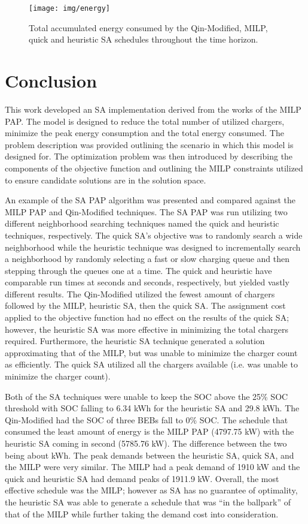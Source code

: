 \documentclass[energies,article,submit,moreauthors]{Definitions/mdpi}
\newcommand{\tempcnt}{9101 }                                                    %
\newcommand{\quicklocal}{0.25 }                                                %
\newcommand{\heuristiclocal}{0.4 }                                             %
\begin{document}
\begin{figure}[htpb]
\centering \texttt{[image: img/energy]}
    \caption{Total accumulated energy consumed by the Qin-Modified, MILP, quick and heuristic SA schedules throughout the time horizon.}
    \label{fig:energy-usage}
\end{figure}

\section{Conclusion}
\label{sec:conclusion}
This work developed an SA implementation derived from the works of the MILP PAP. The model is designed to reduce the
total number of utilized chargers, minimize the peak energy consumption and the total energy consumed. The problem
description was provided outlining the scenario in which this model is designed for. The optimization problem was then
introduced by describing the components of the objective function and outlining the MILP constraints utilized to ensure
candidate solutions are in the solution space.

An example of the SA PAP algorithm was presented and compared against the MILP PAP and Qin-Modified techniques. The SA
PAP was run utilizing two different neighborhood searching techniques named the quick and heuristic techniques,
respectively. The quick SA's objective was to randomly search a wide neighborhood while the heuristic technique was
designed to incrementally search a neighborhood by randomly selecting a fast or slow charging queue and then stepping
through the queues one at a time. The quick and heuristic have comparable run times at \fpeval{\quicklocal * \tempcnt} seconds and \fpeval{\heuristiclocal * \tempcnt} seconds, respectively, but yielded vastly
different results. The Qin-Modified utilized the fewest amount of chargers followed by the MILP, heuristic SA, then the
quick SA. The assignment cost applied to the objective function had no effect on the results of the quick SA; however,
the heuristic SA was more effective in minimizing the total chargers required. Furthermore, the heuristic SA technique
generated a solution approximating that of the MILP, but was unable to minimize the charger count as efficiently. The
quick SA utilized all the chargers available (i.e. was unable to minimize the charger count).

Both of the SA techniques were unable to keep the SOC above the 25\% SOC threshold with SOC falling to 6.34 kWh for the
heuristic SA and 29.8 kWh. The Qin-Modified had the SOC of three BEBs fall to 0\% SOC. The schedule that consumed the
least amount of energy is the MILP PAP (4797.75 kW) with the heuristic SA coming in second (5785.76 kW). The difference
between the two being about  kWh. The peak demands between the heuristic SA, quick
SA, and the MILP were very similar. The MILP had a peak demand of 1910 kW and the quick and heuristic SA had demand
peaks of 1911.9 kW. Overall, the most effective schedule was the MILP; however as SA has no guarantee of optimality, the
heuristic SA was able to generate a schedule that was ``in the ballpark'' of that of the MILP while further taking the
demand cost into consideration.
\end{document}

